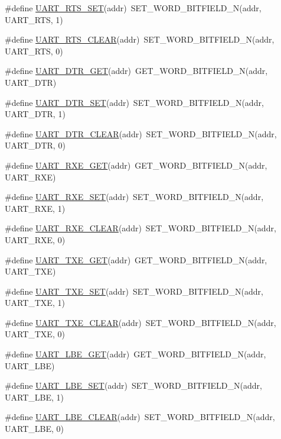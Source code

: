 \begin{DoxyCompactItemize}
\item 
\#define \hyperlink{a00574_af62447cbaf8c7b06ab6fb13ca1e2f1e2}{UART\_\-RTS\_\-SET}(addr)~SET\_\-WORD\_\-BITFIELD\_\-N(addr, UART\_\-RTS, 1)
\item 
\#define \hyperlink{a00574_aefdef042b6fb1efad027ac193d2b7a3b}{UART\_\-RTS\_\-CLEAR}(addr)~SET\_\-WORD\_\-BITFIELD\_\-N(addr, UART\_\-RTS, 0)
\item 
\#define \hyperlink{a00574_a4f22fb546681f9356fcd18a7e354755b}{UART\_\-DTR\_\-GET}(addr)~GET\_\-WORD\_\-BITFIELD\_\-N(addr, UART\_\-DTR)
\item 
\#define \hyperlink{a00574_ae70cc2d2b236a37296021a501ed44cb2}{UART\_\-DTR\_\-SET}(addr)~SET\_\-WORD\_\-BITFIELD\_\-N(addr, UART\_\-DTR, 1)
\item 
\#define \hyperlink{a00574_aa302538eedc5511a5a8a94c158901cdf}{UART\_\-DTR\_\-CLEAR}(addr)~SET\_\-WORD\_\-BITFIELD\_\-N(addr, UART\_\-DTR, 0)
\item 
\#define \hyperlink{a00574_a6f031f0926b4032f41626cf3676cc68d}{UART\_\-RXE\_\-GET}(addr)~GET\_\-WORD\_\-BITFIELD\_\-N(addr, UART\_\-RXE)
\item 
\#define \hyperlink{a00574_ae65679e54509853ec4db15e5817d05db}{UART\_\-RXE\_\-SET}(addr)~SET\_\-WORD\_\-BITFIELD\_\-N(addr, UART\_\-RXE, 1)
\item 
\#define \hyperlink{a00574_abf470a0e05af7aea82580fa1579fc852}{UART\_\-RXE\_\-CLEAR}(addr)~SET\_\-WORD\_\-BITFIELD\_\-N(addr, UART\_\-RXE, 0)
\item 
\#define \hyperlink{a00574_a0aa4847b6a01148e017a4bb252927d41}{UART\_\-TXE\_\-GET}(addr)~GET\_\-WORD\_\-BITFIELD\_\-N(addr, UART\_\-TXE)
\item 
\#define \hyperlink{a00574_a8b5f06173197bb6522cc46dfaa635526}{UART\_\-TXE\_\-SET}(addr)~SET\_\-WORD\_\-BITFIELD\_\-N(addr, UART\_\-TXE, 1)
\item 
\#define \hyperlink{a00574_a9192d2c1e600e5cb81944d4da976d4fa}{UART\_\-TXE\_\-CLEAR}(addr)~SET\_\-WORD\_\-BITFIELD\_\-N(addr, UART\_\-TXE, 0)
\item 
\#define \hyperlink{a00574_afb1d90ab1d8482830605b76992c5e73b}{UART\_\-LBE\_\-GET}(addr)~GET\_\-WORD\_\-BITFIELD\_\-N(addr, UART\_\-LBE)
\item 
\#define \hyperlink{a00574_a52ba028b2971108b7ba9495a5ea678e2}{UART\_\-LBE\_\-SET}(addr)~SET\_\-WORD\_\-BITFIELD\_\-N(addr, UART\_\-LBE, 1)
\item 
\#define \hyperlink{a00574_a6dae1642debf63fba61364ca9e662474}{UART\_\-LBE\_\-CLEAR}(addr)~SET\_\-WORD\_\-BITFIELD\_\-N(addr, UART\_\-LBE, 0)

\end{DoxyCompactItemize}
